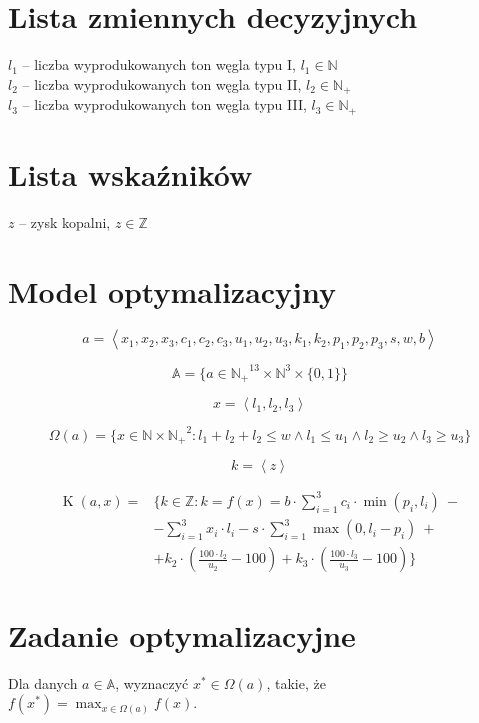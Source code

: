 \documentclass[titlepage]{article}
\begin{document}
\section{Lista zmiennych decyzyjnych}
$l_1$ -- liczba wyprodukowanych ton węgla typu I, $l_1 \in \mathbb{N}$ \\
$l_2$ -- liczba wyprodukowanych ton węgla typu II, $l_2 \in \mathbb{N_+}$ \\
$l_3$ -- liczba wyprodukowanych ton węgla typu III, $l_3 \in \mathbb{N_+}$

\section{Lista wskaźników}
$z$ -- zysk kopalni, $z \in \mathbb{Z}$

\section{Model optymalizacyjny}
\begin{equation}
	a = \left< x_1, x_2, x_3, c_1, c_2, c_3, u_1, u_2, u_3, k_1, k_2, p_1, p_2, p_3, s, w, b \right>
\end{equation}

\begin{equation}
	\mathbb{A} = \{ a \in \mathbb{N_+}^{13} \times \mathbb{N}^3 \times \{ 0, 1 \} \}
\end{equation}

\begin{equation}
	x = \left< l_1, l_2, l_3 \right>
\end{equation}

\begin{equation}
	\Omega(a) = \{ x \in \mathbb{N} \times \mathbb{N_+}^2 : l_1 + l_2 + l_2 \leq w \land l_1 \leq u_1 \land l_2 \geq u_2 \land l_3 \geq u_3 \}
\end{equation}

\begin{equation}
	k = \left< z \right>
\end{equation}

\begin{equation}
	\begin{aligned}
		\operatorname{K}(a, x) ={} & \{ k \in \mathbb{Z} : k = f(x) = b \cdot \sum_{i = 1}^3 c_i \cdot \min{(p_i, l_i)} \ -         \\
		                           & - \sum_{i = 1}^3 x_i \cdot l_i - s \cdot \sum_{i = 1}^3 \max{(0, l_i - p_i)} \ +               \\
		                           & + k_2 \cdot (\frac{100 \cdot l_2}{u_2} - 100) + k_3 \cdot (\frac{100 \cdot l_3}{u_3} - 100) \} 
	\end{aligned}
\end{equation}

\section{Zadanie optymalizacyjne}
Dla danych $a \in \mathbb{A}$, wyznaczyć $x^* \in \Omega(a)$, takie, że $f(x^*) = \max_{x \in \Omega(a)}{f(x)}$.
\end{document}
